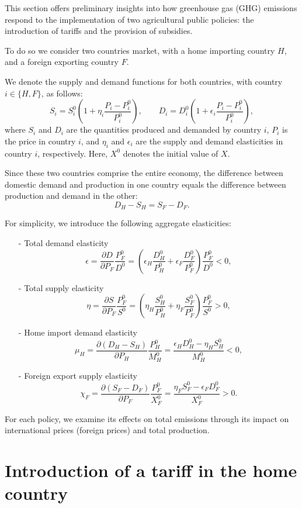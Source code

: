 
This section offers preliminary insights into how greenhouse gas (GHG) emissions respond to the implementation of two agricultural public policies: the introduction of tariffs and the provision of subsidies. 

To do so we consider two countries market, with a home importing country $H$, and a foreign exporting  country $F$.

We denote the supply and demand functions for both countries, with country $i \in \{H, F\}$, as follows:
$$
S_i = S_i^0\left(1 + \eta_i\frac{P_i - P_i^0}{P_i^0}\right), \qquad
D_i = D_i^0\left(1 + \epsilon_i\frac{P_i - P_i^0}{P_i^0}\right),
$$
where $S_i$ and $D_i$ are the quantities produced and demanded by country $i$, $P_i$ is the price in country $i$, and $\eta_i$ and $\epsilon_i$ are the supply and demand elasticities in country $i$, respectively. Here, $X^0$ denotes the initial value of $X$.

Since these two countries comprise the entire economy, the difference between domestic demand and production in one country equals the difference between production and demand in the other: 
$$
D_H - S_H = S_F - D_F.
$$

For simplicity, we introduce the following aggregate elasticities:
\begin{itemize}
    \item[-] Total demand elasticity
    $$
    \epsilon = \frac{\partial D}{\partial P_F} \frac{P_F^0}{D^0} = \left( \epsilon_H \frac{D_H^0}{P_H^0} + \epsilon_F \frac{D_F^0}{P_F^0} \right)\frac{P_F^0}{D^0} < 0,
    $$
    \item[-] Total supply elasticity
    $$
    \eta = \frac{\partial S}{\partial P_F} \frac{P_F^0}{S^0} = \left( \eta_H \frac{S_H^0}{P_H^0} + \eta_F \frac{S_F^0}{P_F^0} \right)\frac{P_F^0}{S^0} > 0,
    $$
    \item[-] Home import demand elasticity
    $$
    \mu_H = \frac{\partial (D_H - S_H)}{\partial P_H} \frac{P_H^0}{M_H^0} = \frac{\epsilon_H D_H^0 - \eta_H S_H^0}{M_H^0} < 0,
    $$
    \item[-] Foreign export supply elasticity
    $$
    \chi_F = \frac{\partial (S_F - D_F)}{\partial P_F} \frac{P_F^0}{X_F^0} = \frac{\eta_F S_F^0 - \epsilon_F D_F^0}{X_F^0} > 0.
    $$
\end{itemize}

For each policy, we examine its effects on total emissions through its impact on international prices (foreign prices) and total production.

\section{Introduction of a tariff in the home country}\label{Sec_tariff}

